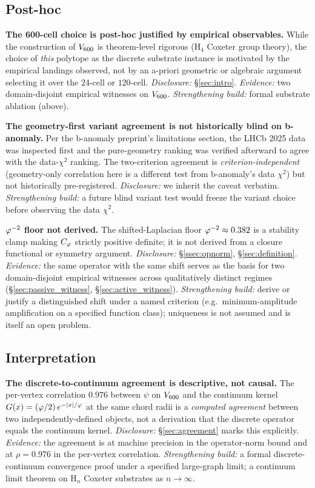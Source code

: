 \subsection{Post-hoc}\label{ssec:posthoc}

\textbf{The 600-cell choice is post-hoc justified by empirical
observables.} While the construction of $V_{600}$ is
theorem-level rigorous (H$_4$ Coxeter group theory), the choice
of \emph{this} polytope as the discrete substrate instance is
motivated by the empirical landings observed, not by an a-priori
geometric or algebraic argument selecting it over the $24$-cell
or $120$-cell. \emph{Disclosure:} \S\ref{sec:intro}.
\emph{Evidence:} two domain-disjoint empirical witnesses on
$V_{600}$. \emph{Strengthening build:} formal substrate
ablation (above).

\textbf{The geometry-first variant agreement is not historically
blind on b-anomaly.} Per the b-anomaly preprint's limitations
section, the LHCb 2025 data was inspected first and the
pure-geometry ranking was verified afterward to agree with the
data-$\chi^{2}$ ranking. The two-criterion agreement is
\emph{criterion-independent} (geometry-only correlation here is a
different test from b-anomaly's data $\chi^{2}$) but not
historically pre-registered. \emph{Disclosure:} we inherit the
caveat verbatim. \emph{Strengthening build:} a future blind variant
test would freeze the variant choice before observing the data
$\chi^{2}$.

\textbf{$\varphi^{-2}$ floor not derived.} The shifted-Laplacian floor
$\varphi^{-2} \approx 0.382$ is a stability clamp making $C_{\varphi}$
strictly positive definite; it is not derived from a closure
functional or symmetry argument. \emph{Disclosure:}
\S\ref{ssec:opnorm}, \S\ref{sec:definition}. \emph{Evidence:} the
same operator with the same shift serves as the basis for two
domain-disjoint empirical witnesses across qualitatively distinct
regimes (\S\ref{sec:passive_witness},
\S\ref{sec:active_witness}). \emph{Strengthening build:} derive
or justify a distinguished shift under a named criterion (e.g.\
minimum-amplitude amplification on a specified function class);
uniqueness is not assumed and is itself an open problem.

\subsection{Interpretation}\label{ssec:interpretation}

\textbf{The discrete-to-continuum agreement is descriptive, not
causal.} The per-vertex correlation $0.976$ between $\psi$ on
$V_{600}$ and the continuum kernel
$G(x) = (\varphi/2)\,e^{-|x|/\varphi}$ at the same chord radii is a
\emph{computed agreement} between two independently-defined
objects, not a derivation that the discrete operator equals the
continuum kernel. \emph{Disclosure:} \S\ref{sec:agreement} marks
this explicitly. \emph{Evidence:} the agreement is at machine
precision in the operator-norm bound and at $\rho = 0.976$ in the
per-vertex correlation. \emph{Strengthening build:} a formal
discrete-continuum convergence proof under a specified large-graph
limit; a continuum limit theorem on H$_n$ Coxeter substrates as
$n \to \infty$.

